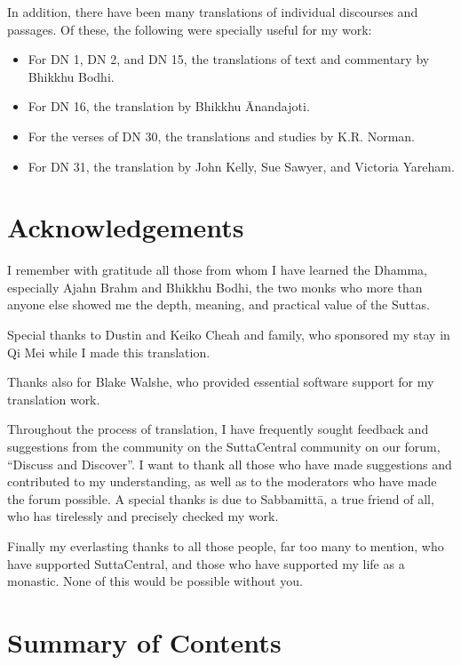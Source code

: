 \documentclass[12pt,openany]{book}%
\begin{document}
In addition, there have been many translations of individual discourses and passages. Of these, the following were specially useful for my work:

\begin{itemize}%
\item For DN 1, DN 2, and DN 15, the translations of text and commentary by Bhikkhu Bodhi.%
\item For DN 16, the translation by Bhikkhu Ānandajoti.%
\item For the verses of DN 30, the translations and studies by K.R. Norman.%
\item For DN 31, the translation by John Kelly, Sue Sawyer, and Victoria Yareham.%
\end{itemize}

%
\chapter*{Acknowledgements}

I remember with gratitude all those from whom I have learned the Dhamma, especially Ajahn Brahm and Bhikkhu Bodhi, the two monks who more than anyone else showed me the depth, meaning, and practical value of the Suttas.

Special thanks to Dustin and Keiko Cheah and family, who sponsored my stay in Qi Mei while I made this translation.

Thanks also for Blake Walshe, who provided essential software support for my translation work.

Throughout the process of translation, I have frequently sought feedback and suggestions from the community on the SuttaCentral community on our forum, “Discuss and Discover”. I want to thank all those who have made suggestions and contributed to my understanding, as well as to the moderators who have made the forum possible. A special thanks is due to \textsanskrit{Sabbamittā}, a true friend of all, who has tirelessly and precisely checked my work.

Finally my everlasting thanks to all those people, far too many to mention, who have supported SuttaCentral, and those who have supported my life as a monastic. None of this would be possible without you.

%
\chapter*{Summary of Contents}
\end{document}
